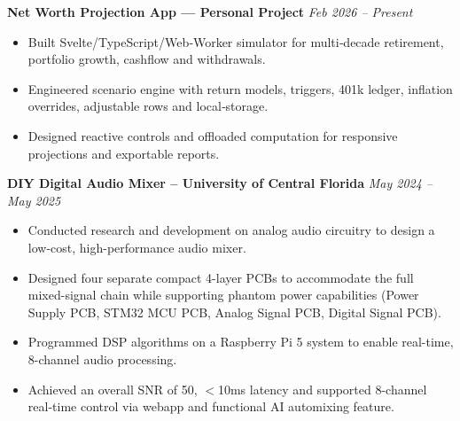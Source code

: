\documentclass[9pt,letterpaper]{article}
\newcommand{\sectionHeading}[1]{%
  \noindent\textbf{\large\textcolor{myblue}{#1}}%
  \par\vspace{-1.5ex}%
  \noindent\textcolor{myblue}{\rule{\linewidth}{0.7pt}}%
}
\begin{document}
\textbf{Net Worth Projection App — Personal Project}
\hfill \textit{Feb 2026 -- Present}
\begin{itemize}
  \item Built Svelte/TypeScript/Web‑Worker simulator for multi‑decade retirement, portfolio growth, cashflow and withdrawals.
  \item Engineered scenario engine with return models, triggers, 401k ledger, inflation overrides, adjustable rows and local‑storage.
  \item Designed reactive controls and offloaded computation for responsive projections and exportable reports.
\end{itemize}

\textbf{DIY Digital Audio Mixer -- University of Central Florida}
\hfill \textit{May 2024 -- May 2025}
\begin{itemize}
  \item Conducted research and development on analog audio circuitry to design a low-cost, high-performance audio mixer.
  \item Designed four separate compact 4-layer PCBs to accommodate the full mixed-signal chain while supporting phantom power capabilities (Power Supply PCB, STM32 MCU PCB, Analog Signal PCB, Digital Signal PCB).
  \item Programmed DSP algorithms on a Raspberry Pi 5 system to enable real-time, 8-channel audio processing.
  \item Achieved an overall SNR of 50, $<$10ms latency and supported 8-channel real-time control via webapp and functional AI automixing feature.
\end{itemize}






\end{document}

